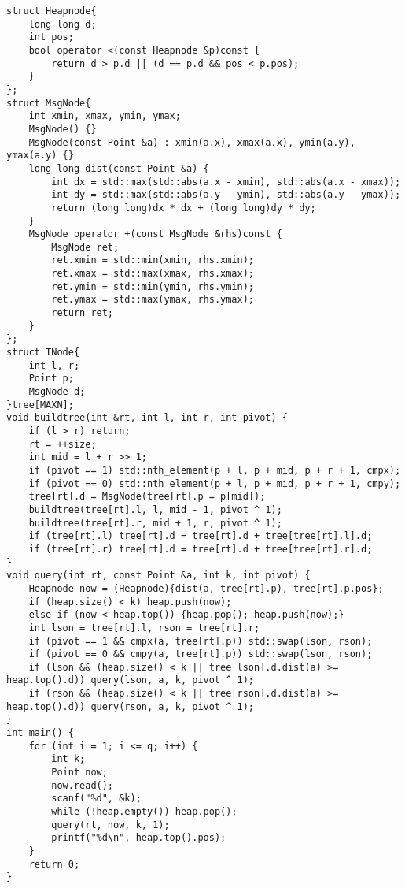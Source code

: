 \begin{lstlisting}
struct Heapnode{
	long long d;
	int pos;
	bool operator <(const Heapnode &p)const {
		return d > p.d || (d == p.d && pos < p.pos);
	}
};
struct MsgNode{
	int xmin, xmax, ymin, ymax;
	MsgNode() {}
	MsgNode(const Point &a) : xmin(a.x), xmax(a.x), ymin(a.y), ymax(a.y) {}
	long long dist(const Point &a) {
		int dx = std::max(std::abs(a.x - xmin), std::abs(a.x - xmax));
		int dy = std::max(std::abs(a.y - ymin), std::abs(a.y - ymax));
		return (long long)dx * dx + (long long)dy * dy;
	}
	MsgNode operator +(const MsgNode &rhs)const {
		MsgNode ret;
		ret.xmin = std::min(xmin, rhs.xmin);
		ret.xmax = std::max(xmax, rhs.xmax);
		ret.ymin = std::min(ymin, rhs.ymin);
		ret.ymax = std::max(ymax, rhs.ymax);
		return ret;
	}
};
struct TNode{
	int l, r;
	Point p;
	MsgNode d;
}tree[MAXN];
void buildtree(int &rt, int l, int r, int pivot) {
	if (l > r) return;
	rt = ++size;
	int mid = l + r >> 1;
	if (pivot == 1) std::nth_element(p + l, p + mid, p + r + 1, cmpx);
	if (pivot == 0) std::nth_element(p + l, p + mid, p + r + 1, cmpy);
	tree[rt].d = MsgNode(tree[rt].p = p[mid]);
	buildtree(tree[rt].l, l, mid - 1, pivot ^ 1);
	buildtree(tree[rt].r, mid + 1, r, pivot ^ 1);
	if (tree[rt].l) tree[rt].d = tree[rt].d + tree[tree[rt].l].d;
	if (tree[rt].r) tree[rt].d = tree[rt].d + tree[tree[rt].r].d;
}
void query(int rt, const Point &a, int k, int pivot) {
	Heapnode now = (Heapnode){dist(a, tree[rt].p), tree[rt].p.pos};
	if (heap.size() < k) heap.push(now);
	else if (now < heap.top()) {heap.pop(); heap.push(now);}
	int lson = tree[rt].l, rson = tree[rt].r;
	if (pivot == 1 && cmpx(a, tree[rt].p)) std::swap(lson, rson);
	if (pivot == 0 && cmpy(a, tree[rt].p)) std::swap(lson, rson);
	if (lson && (heap.size() < k || tree[lson].d.dist(a) >= heap.top().d)) query(lson, a, k, pivot ^ 1);
	if (rson && (heap.size() < k || tree[rson].d.dist(a) >= heap.top().d)) query(rson, a, k, pivot ^ 1);
}
int main() {
	for (int i = 1; i <= q; i++) {
		int k;
		Point now;
		now.read();
		scanf("%d", &k);
		while (!heap.empty()) heap.pop();
		query(rt, now, k, 1);
		printf("%d\n", heap.top().pos);
	}
	return 0;
}
\end{lstlisting}
